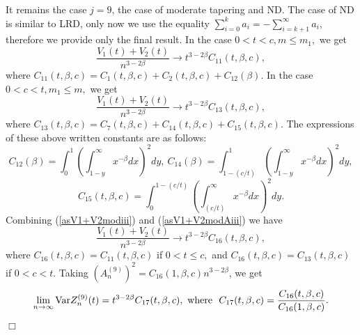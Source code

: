 \documentclass[12pt]{article}
\def\b{\beta}
\newcommand{\halmos}{\vspace{3mm} \hfill \mbox{$\Box$}\\[2mm]}
\theoremstyle{plain}
\theoremstyle{definition}
\begin{document}
It remains the case $j=9$, the case of moderate tapering and ND. The case of  ND is similar to LRD, only now we use the equality $\sum_{i=0}^{k} a_{i}=-\sum_{i=k+1}^\infty a_{i}$, therefore we provide only the final result. In the case $0<t<c,  m\le m_1, $ we get
\begin{equation}\label{asV1+V2modiii}
\frac{V_1(t)+V_{2}(t)}{n^{3-2\b}} \to t^{3-2\b}C_{11}(t, \b, c),
\end{equation}
where $C_{11}(t, \b, c)=C_{1}(t, \b, c)+ C_{2}(t, \b, c) + C_{12}(\b).$
In the case $0<c<t,  m_1\le m, $ we get
\begin{equation}\label{asV1+V2modAiii}
\frac{V_1(t)+V_{2}(t)}{n^{3-2\b}} \to t^{3-2\b}C_{13}(t, \b, c),
\end{equation}
where
$C_{13}(t, \b, c)=C_{7}(t, \b, c)+C_{14}(t, \b, c)+C_{15}(t, \b, c).$
The expressions of these above written constants are as follows:
$$
 C_{12}(\b)=\int_0^1\left (\int_{1-y}^\infty x^{-\b} dx\right )^2 dy   , \  C_{14}(\b)=\int_{1-(c/t)}^{1}\left (\int_{1-y}^\infty x^{-\b} dx\right )^2 dy,
$$
$$
C_{15}(t, \b, c)=\int_0^{1-(c/t)}\left (\int_{(c/t)}^\infty x^{-\b} dx\right )^2 dy.
$$
Combining (\ref{asV1+V2modiii}) and (\ref{asV1+V2modAiii}) we have
$$%
\frac{V_1(t)+V_{2}(t)}{n^{3-2\b}} \to t^{3-2\b}C_{16}(t, \b, c),
$$
where
$C_{16}(t, \b, c)=C_{11}(t, \b, c) $ if $ 0<t\le c,$ and $C_{16}(t, \b, c)=C_{13}(t, \b, c) $ if $ 0<c< t.$
Taking $\left (A_n^{(9)}\right )^2= C_{16}(1, \b, c)n^{3-2\b}$, we get
\begin{equation}\label{VarZn3iii}
\lim_{n\to \infty}{\rm Var}Z_n^{(9)}(t)=t^{3-2\b}C_{17}(t, \b, c), \ {\rm where} \ \  C_{17}(t, \b, c)=\frac{C_{16}(t, \b, c)}{C_{16}(1, \b, c)}.
\end{equation}
\halmos
\end{document}
